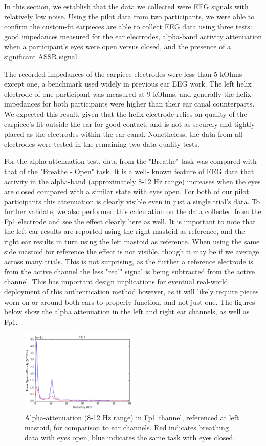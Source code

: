 \documentclass[letterpaper,twocolumn,10pt]{article}
\begin{document}
In this section, we establish that the data we collected were EEG signals with relatively low noise. 
Using the pilot data from two participants, we were able to confirm the custom-fit earpieces are able to collect EEG
data using three tests: good impedances measured for the ear electrodes, alpha-band activity attenuation when a
participant's eyes were open versus closed, and the presence of a significant ASSR signal.

The recorded impedances of the earpiece electrodes were less than 5 kOhms except one, a benchmark used widely in previous
ear EEG work. The left helix electrode of one participant was measured at 9 kOhms, and generally the 
helix impedances for both participants were higher than their ear canal counterparts. We expected this result, given that the
helix electrode relies on quality of the earpiece's fit outside the ear for good contact, and is not as securely and tightly placed as the
electrodes within the ear canal. Nonetheless, the data from all electrodes were tested in the remaining two data quality tests.

For the alpha-attenuation test, data from the "Breathe" task was compared with that of the "Breathe - Open" task. It is a well-
known feature of EEG data that activity in the alpha-band (approximately 8-12 Hz range) increases when the eyes are closed
compared with a similar state with eyes open. For both of our pilot participants this attenuation is clearly visible even in just
a single trial's data. To further validate, we also performed this calculation on the data collected from the Fp1 electrode and see
the effect clearly here as well. It is important to note that the left ear results are reported using the right mastoid as reference, and
the right ear results in turn using the left mastoid as reference. When using the same side mastoid for reference the effect is not 
visible, though it may be if we average across many trials. This is not surprising, as the further a reference electrode is from the active
channel the less "real" signal is being subtracted from the active channel. This has important design implications for eventual 
real-world deployment of this authentication method however, as it will likely require pieces worn on or around both ears to properly 
function, and not just one. The figures below show the alpha attenuation in the left and right ear channels, as well as Fp1.

\begin{figure}[h]
\centering
\includegraphics[width=0.5\textwidth]{figures/001_AlphaAtt_Fp1.jpg}
\caption{Alpha-attenuation (8-12 Hz range) in Fp1 channel, referenced at left mastoid, for comparison to ear channels. Red indicates breathing data with
eyes open, blue indicates the same task with eyes closed.}
\end{figure}
\end{document}
